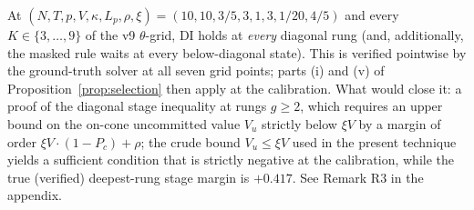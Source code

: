 \begin{conjecture}\label{conj:DI}
At $(N,T,p,V,\kappa,L_p,\rho,\xi) = (10, 10, 3/5, 3, 1, 3, 1/20, 4/5)$ and every $K \in \{3, \dots, 9\}$ of the v9 $\theta$-grid, DI holds at \emph{every} diagonal rung (and, additionally, the masked rule waits at every below-diagonal state). This is verified pointwise by the ground-truth solver at all seven grid points; parts (i) and (v) of Proposition~\ref{prop:selection} then apply at the calibration. What would close it: a proof of the diagonal stage inequality at rungs $g \ge 2$, which requires an upper bound on the on-cone uncommitted value $V_u$ strictly below $\xi V$ by a margin of order $\xi V \cdot (1 - P_c) + \rho$; the crude bound $V_u \le \xi V$ used in the present technique yields a sufficient condition that is strictly negative at the calibration, while the true (verified) deepest-rung stage margin is $+0.417$. See Remark R3 in the appendix.
\end{conjecture}
